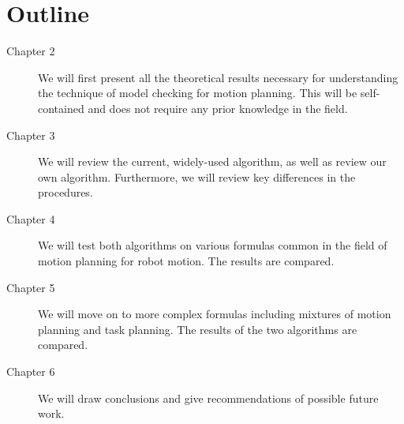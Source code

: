 \section{Outline}
\begin{description}
    \item[Chapter 2] We will first present all the theoretical results necessary for understanding the technique of model checking for motion planning. This will be self-contained and does not require any prior knowledge in the field.
    \item[Chapter 3] We will review the current, widely-used algorithm, as well as review our own algorithm. Furthermore, we will review key differences in the procedures.
    \item[Chapter 4] We will test both algorithms on various formulas common in the field of motion planning for robot motion. The results are compared. %
    \item[Chapter 5] We will move on to more complex formulas including mixtures of motion planning and task planning. The results of the two algorithms are compared. 
    \item[Chapter 6] We will draw conclusions and give recommendations of possible future work.
\end{description}

